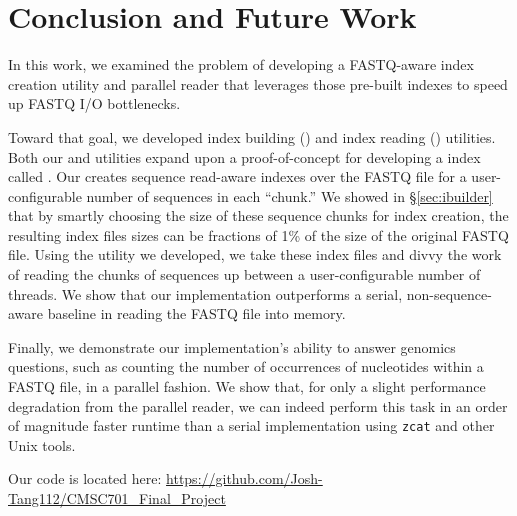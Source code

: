 \section{Conclusion and Future Work}

In this work, we examined the problem of developing a FASTQ-aware \gzip index
creation utility and parallel reader that leverages those pre-built indexes to
speed up \gzip FASTQ I/O bottlenecks. 

Toward that goal, we developed index building (\ibuilder) and index reading
(\ireader) utilities. Both our \ibuilder and \ireader utilities expand upon a
proof-of-concept for developing a \gzip index called \zran. Our \ibuilder
creates sequence read-aware indexes over the \gzip FASTQ file for a
user-configurable number of sequences in each ``chunk.'' We showed in
\S\ref{sec:ibuilder} that by smartly choosing the size of these sequence chunks
for index creation, the resulting index files sizes can be fractions of 1\% of
the size of the original \gzip FASTQ file. Using the \ireader utility we
developed, we take these index files and divvy the work of reading the chunks of
sequences up between a user-configurable number of threads. We show that our
implementation outperforms a serial, non-sequence-aware baseline in reading the
FASTQ file into memory. 

Finally, we demonstrate our implementation's ability to answer genomics
questions, such as counting the number of occurrences of nucleotides within a
\gzip FASTQ file, in a parallel fashion. We show that, for only a slight
performance degradation from the parallel reader, we can indeed perform this
task in an order of magnitude faster runtime than a serial implementation using
\texttt{zcat} and other Unix tools.

Our code is located here:
\url{https://github.com/Josh-Tang112/CMSC701_Final_Project}
